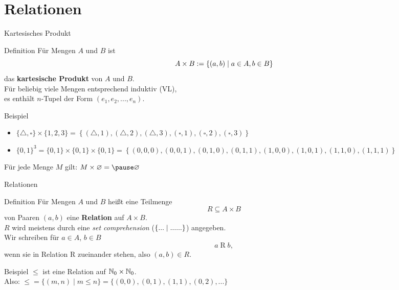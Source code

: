 \section{Relationen}

\begin{frame}{Kartesisches Produkt}
	\begin{block}{Definition}
		Für Mengen $A$ und $B$ ist
		$$A \times B := \left\{ (a,b) \mid a \in A, b \in B \right\}$$
		das \textbf{kartesische Produkt} von $A$ und $B$. \\
		\impl Für beliebig viele Mengen entsprechend induktiv (VL), \\
		es enthält $n$-Tupel der Form $(e_1, e_2, ..., e_n)$.
	\end{block}

	\pause
	\begin{block}{Beispiel}
		\begin{itemize}
			\item $\{\triangle,\square\} \times \{1, 2, 3\} = \left\{(\triangle, 1), (\triangle, 2), (\triangle, 3), (\square, 1), (\square, 2), (\square, 3)\right\}$ 
			\item 	$\{0, 1\}^3 = \{0,1\} \times \{0,1\} \times \{0,1\} = \left\{(0, 0, 0), (0, 0, 1), (0, 1, 0), (0, 1, 1), (1, 0, 0), (1, 0, 1), (1, 1, 0), (1, 1, 1)\right\} $
		\end{itemize}
		
	 
	   Für jede Menge $M$ gilt: $ M \times \emptyset = \pause \emptyset $
	\end{block}
\end{frame}

\begin{frame}{Relationen}
	\begin{block}{Definition}
		Für Mengen $A$ und $B$ heißt eine Teilmenge 
		$$R \subseteq A \times B$$
		von Paaren $(a,b)$ eine \textbf{Relation} auf $A \times B$. \\
		\smallskip
		$R$ wird meistens durch eine \emph{set comprehension} ($\left\{... \mid ......\right\}$) angegeben. \\
		\smallskip
		Wir schreiben für $a \in A$, $b \in B$ 
		$$a \mathrel{R} b, $$
		wenn sie in Relation R zueinander stehen, also $(a, b) \in R$.
	\end{block}
	
	\pause
	\begin{block}{Beispiel} 
		$\leq$ ist eine Relation auf $\mathbb{N}_0 \times \mathbb{N}_0 $. \\
		Also: $ \text{$\leq$} = \{(m, n) \mid m \leq n \} = \{(0, 0), (0, 1), (1, 1), (0, 2), ...\} $
	\end{block}
\end{frame}


